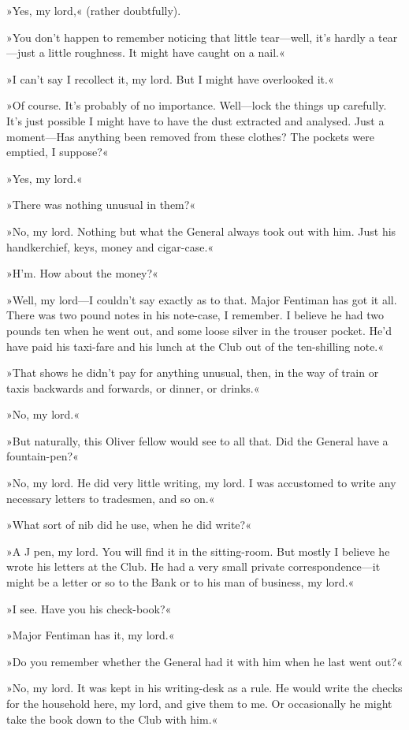»Yes, my lord,« (rather doubtfully).

»You don't happen to remember noticing that little tear—well, it's hardly a tear—just a little roughness. It might have caught on a nail.«

»I can't say I recollect it, my lord. But I might have overlooked it.«

»Of course. It's probably of no importance. Well—lock the things up carefully. It's just possible I might have to have the dust extracted and analysed. Just a moment—Has anything been removed from these clothes? The pockets were emptied, I suppose?«

»Yes, my lord.«

»There was nothing unusual in them?«

»No, my lord. Nothing but what the General always took out with him. Just his handkerchief, keys, money and cigar-case.«

»H'm. How about the money?«

»Well, my lord—I couldn't say exactly as to that. Major Fentiman has got it all. There was two pound notes in his note-case, I remember. I believe he had two pounds ten when he went out, and some loose silver in the trouser pocket. He'd have paid his taxi-fare and his lunch at the Club out of the ten-shilling note.«

»That shows he didn't pay for anything unusual, then, in the way of train or taxis backwards and forwards, or dinner, or drinks.«

»No, my lord.«

»But naturally, this Oliver fellow would see to all that. Did the General have a fountain-pen?«

»No, my lord. He did very little writing, my lord. I was accustomed to write any necessary letters to tradesmen, and so on.«

»What sort of nib did he use, when he did write?«

»A J pen, my lord. You will find it in the sitting-room. But mostly I believe he wrote his letters at the Club. He had a very small private correspondence—it might be a letter or so to the Bank or to his man of business, my lord.«

»I see. Have you his check-book?«

»Major Fentiman has it, my lord.«

»Do you remember whether the General had it with him when he last went out?«

»No, my lord. It was kept in his writing-desk as a rule. He would write the checks for the household here, my lord, and give them to me. Or occasionally he might take the book down to the Club with him.«

